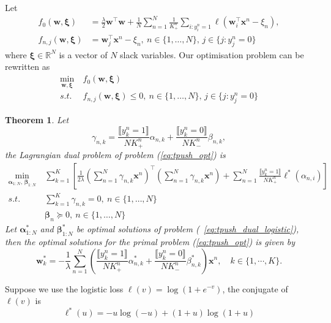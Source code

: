 \documentclass[9pt]{extarticle}
\newtheorem{theorem}{Theorem}
\newcommand{\llb}{\llbracket}
\newcommand{\rrb}{\rrbracket}
\newcommand{\x}{\mathbf{x}}
\newcommand{\1}{\mathbf{1}}
\newcommand{\w}{\mathbf{w}}
\newcommand{\R}{\mathbb{R}}
\newcommand{\alphabm}{\bm{\alpha}}
\newcommand{\betabm}{\bm{\beta}}
\newcommand{\xibm}{\bm{\xi}}
\begin{document}
Let
\begin{align*}
f_0(\w, \xibm)     
&= \frac{\lambda}{2} \w^\top \w + \frac{1}{N} \sum_{n=1}^N \frac{1}{K_+^n} \sum_{i:y_i^n=1} \ell \left( \w_i^\top \x^n - \xi_n \right), \\
%
f_{n,j}(\w, \xibm) 
&= \w_j^\top \x^n - \xi_n, \ n \in \{1,\dots,N\}, \, j \in \{j: y_j^n = 0\}
\end{align*}
where $\xibm \in \R^{N}$ is a vector of $N$ slack variables.
%
Our optimisation problem can be rewritten as
\begin{equation}
\label{eq:tpush_opt}
\begin{aligned}
\min_{\w, \xibm} \ & f_0(\w, \xibm) \\
s.t.             \ & f_{n,j}(\w, \xibm) \le 0, \ n \in \{1,\dots,N\}, \, j \in \{j: y_j^n = 0\}
\end{aligned}
\end{equation}
%
\begin{theorem}
\label{th:dual}
Let
$$
\gamma_{n,k} = \frac{\llb y_k^n=1 \rrb} {N K_+^n} \alpha_{n,k} + \frac{\llb y_k^n=0 \rrb} {N K_-^n} \beta_{n,k},
$$
the Lagrangian dual problem of problem (\ref{eq:tpush_opt}) is
\begin{equation}
\label{eq:tpush_dual}
\begin{aligned}
\underset{\alphabm_{1:N}, \, \betabm_{1:N}}{\min} \ &
    \sum_{k=1}^K \left[ 
    \frac{1}{2 \lambda} \left( \sum_{n=1}^N \gamma_{n,k} \x^n \right)^\top \left( \sum_{n=1}^N \gamma_{n,k} \x^n \right) +
    \sum_{n=1}^N \frac{\llb y_k^n = 1 \rrb}{N K_+^n} \ell^*(\alpha_{n,i}) \right] \\
s.t. \ \quad & \sum_{k=1}^K \gamma_{n,k} = 0, \ n \in \{1,\dots,N\} \\
             & \betabm_n \succeq 0, \ n \in \{1,\dots,N\}
\end{aligned}
\end{equation}
Let $\alphabm_{1:N}^*$ and $\betabm_{1:N}^*$ be optimal solutions of problem (~\ref{eq:tpush_dual_logistic}),
then the optimal solutions for the primal problem (\ref{eq:tpush_opt}) is given by
$$
\w_k^*
= -\frac{1}{\lambda} \sum_{n=1}^N \left( 
   \frac{\llb y_k^n=1 \rrb} {N K_+^n} \alpha_{n,k}^* + \frac{\llb y_k^n=0 \rrb} {N K_-^n} \beta_{n,k}^* \right) \x^n, \quad k \in \{1,\cdots,K\}.
$$
\end{theorem}
%
\vspace{1em}
%
Suppose we use the logistic loss $\ell(v) = \log(1 + e^{-v})$, the conjugate of $\ell(v)$ is
\begin{equation}
\label{eq:conjugate_logistic}
\ell^*(u) = - u\log(-u) + (1+u) \log(1+u)
\end{equation}
\end{document}
